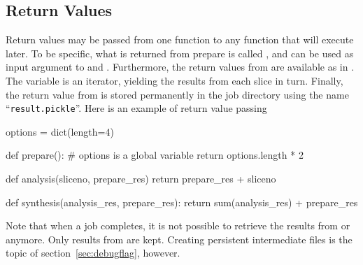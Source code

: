 \subsection{Return Values}
Return values may be passed from one function to any function that
will execute later.  To be specific, what is returned from prepare is
called \prepareres, and can be used as input argument to \analysis and
\synthesis.  Furthermore, the return values from \analysis are
available as \analysisres in \synthesis.  The \analysisres variable is
an iterator, yielding the results from each slice in turn.  Finally,
the return value from \synthesis is stored permanently in the job
directory using the name ``\texttt{result.pickle}''.  Here is an
example of return value passing
\begin{python}
options = dict(length=4)

def prepare():
    # options is a global variable
    return options.length * 2

def analysis(sliceno, prepare_res)
    return prepare_res + sliceno

def synthesis(analysis_res, prepare_res):
     return sum(analysis_res) + prepare_res
\end{python}
Note that when a job completes, it is not possible to retrieve the
results from \prepare or \analysis anymore.  Only results from
\synthesis are kept.  Creating persistent intermediate files is the topic of
section~\ref{sec:debugflag}, however.


